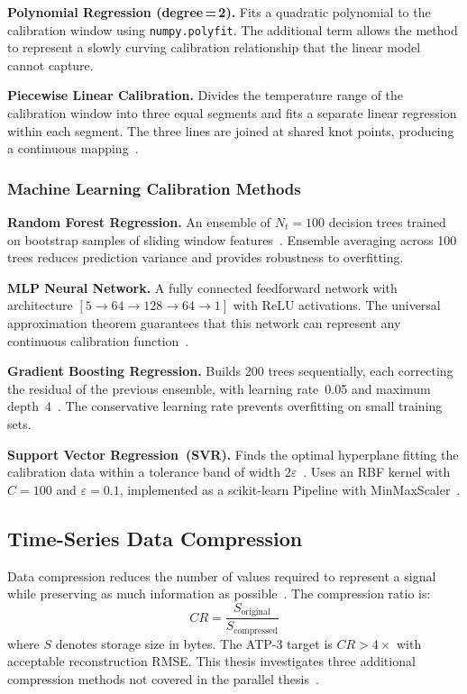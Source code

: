 \textbf{Polynomial Regression (degree\,=\,2).} Fits a quadratic polynomial to the calibration window using \texttt{numpy.polyfit}. The additional term allows the method to represent a slowly curving calibration relationship that the linear model cannot capture.

\textbf{Piecewise Linear Calibration.} Divides the temperature range of the calibration window into three equal segments and fits a separate linear regression within each segment. The three lines are joined at shared knot points, producing a continuous mapping~\cite{optical_pyrometer_validation}.

\subsubsection*{Machine Learning Calibration Methods}

\textbf{Random Forest Regression.} An ensemble of $N_t = 100$ decision trees trained on bootstrap samples of sliding window features~\cite{random_forest_breiman}. Ensemble averaging across 100 trees reduces prediction variance and provides robustness to overfitting.

\textbf{MLP Neural Network.} A fully connected feedforward network with architecture $[5 \rightarrow 64 \rightarrow 128 \rightarrow 64 \rightarrow 1]$ with ReLU activations. The universal approximation theorem guarantees that this network can represent any continuous calibration function~\cite{mlp_universal_approx}.

\textbf{Gradient Boosting Regression.} Builds 200 trees sequentially, each correcting the residual of the previous ensemble, with learning rate~0.05 and maximum depth~4~\cite{ml_thermal_processing}. The conservative learning rate prevents overfitting on small training sets.

\textbf{Support Vector Regression~(SVR).} Finds the optimal hyperplane fitting the calibration data within a tolerance band of width $2\varepsilon$~\cite{ml_thermal_processing}. Uses an RBF kernel with $C=100$ and $\varepsilon=0.1$, implemented as a scikit-learn Pipeline with MinMaxScaler~\cite{scikit-learn}.

\subsection{Time-Series Data Compression}
\label{subsec:compression_bg}

Data compression reduces the number of values required to represent a signal while preserving as much information as possible~\cite{lossless_compression}. The compression ratio is:
\begin{equation}
CR = \frac{S_{\text{original}}}{S_{\text{compressed}}}
\label{eq:cr}
\end{equation}
where $S$ denotes storage size in bytes. The ATP-3 target is $CR > 4\times$ with acceptable reconstruction RMSE. This thesis investigates three additional compression methods not covered in the parallel thesis~\cite{sravya2026}.

